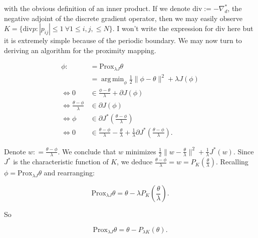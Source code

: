 \documentclass[paper=a4, fontsize=11pt]{scrartcl} %
\DeclareMathOperator*{\argmin}{arg\,min}
\numberwithin{equation}{section} %
\numberwithin{figure}{section} %
\numberwithin{table}{section} %
\newcommand{\param}{\theta}
\newcommand{\paramm}{\phi}
\newcommand{\prox}{\text{Prox}}
\newcommand{\grad}{\nabla_{d} }
\newcommand{\divg}{\text{div}}
\begin{document}
with the obvious definition of an inner product. If we denote $ \divg
:= -\grad^{*}$, the negative adjoint of the discrete gradient
operator, then we may easily observe $K = \{ \divg p: |p_{ij}| \leq 1
\ \forall 1 \leq i,j, \leq N \}$. I won't write the expression for
$\divg$ here but it is extremely simple because of the periodic
boundary. We may now turn to deriving an algorithm for the proximity
mapping.

\begin{align*}
  \paramm :&= \prox_{\lambda J}\param \\
  &= \argmin_{\paramm} \frac{1}{2}\| \paramm - \param \|^2 + \lambda J(\paramm) \\
  \Leftrightarrow 0 &\in \frac{\paramm - \param}{\lambda} + \partial J(\paramm) \\
  \Leftrightarrow \frac{\param - \paramm}{\lambda} &\in \partial J(\paramm) \\
  \Leftrightarrow \paramm &\in \partial J^{*}\left ( \frac{\param - \paramm}{\lambda}\right ) \\
  \Leftrightarrow 0
  &\in \frac{\param - \paramm}{\lambda} - \frac{\param}{\lambda} + \frac{1}{\lambda} \partial J^{*}\left ( \frac{\param - \paramm}{\lambda} \right ).
\end{align*}

Denote $w: = \frac{\param - \paramm}{\lambda}$. We conclude that $w$
minimizes $\frac{1}{2}\| w - \frac{\param}{\lambda}\|^2 +
\frac{1}{\lambda}J^{*}(w)$.  Since $J^{*}$ is the characteristic
function of $K$, we deduce $\frac{\param-\paramm}{\lambda} = w = P_{K}( \frac{\param}{\lambda} )$.
Recalling $\paramm= \prox_{\lambda J}\param$ and rearranging:

\begin{equation*}%
  \prox_{\lambda J}\param = \param -  \lambda P_{K}\left ( \frac{\param}{\lambda} \right ).
\end{equation*}

So

\begin{equation}\label{eq:chambolle prox}
  \prox_{\lambda J}\param = \param - P_{\lambda K} ( \param ).
\end{equation}


\end{document}
